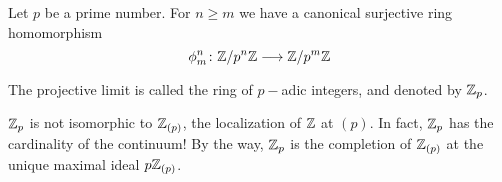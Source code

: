   \begin{defn}
    Let $p$ be a prime number. For $n\geqslant m$ we have a canonical surjective ring homomorphism
    \begin{equation*}
      \phi^n_m\colon {\mathbb Z}/p^n{\mathbb Z} \longrightarrow {\mathbb Z}/p^m{\mathbb Z}
    \end{equation*}

    The projective limit is called the ring of $p-$adic integers, and denoted by ${\mathbb Z}_p$.
  \end{defn}
  \begin{warn}
     ${\mathbb Z}_p$ is not isomorphic to ${\mathbb Z}_{(p)}$, the localization of ${\mathbb Z}$ at $(p)$. In fact, ${\mathbb Z}_p$ has the cardinality of the continuum! By the way, ${\mathbb Z}_p$ is the completion of ${\mathbb Z}_{(p)}$ at the unique maximal ideal $p{\mathbb Z}_{(p)}$.
  \end{warn}

